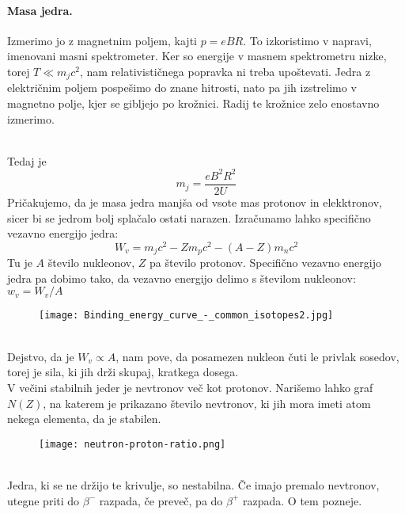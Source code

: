 \documentclass[a4paper]{article}
\begin{document}
\paragraph{Masa jedra.} Izmerimo jo z magnetnim poljem, kajti $p = eBR$. To izkoristimo v napravi, imenovani masni spektrometer.
Ker so energije v masnem spektrometru nizke, torej $T \ll m_jc^2$, nam relativističnega popravka ni treba upoštevati. Jedra z električnim poljem pospešimo do znane hitrosti,
nato pa jih izstrelimo v magnetno polje, kjer se gibljejo po krožnici. Radij te krožnice zelo enostavno izmerimo.
\begin{figure}
    \centering
\end{figure} \\
Tedaj je $$m_j = \frac{eB^2R^2}{2U}$$
Pričakujemo, da je masa jedra manjša od vsote mas protonov in elekktronov, sicer bi se jedrom bolj splačalo ostati narazen. Izračunamo lahko specifično vezavno energijo jedra:
$$W_v = m_jc^2 - Zm_pc^2 - (A-Z)m_nc^2$$
Tu je $A$ število nukleonov, $Z$ pa število protonov. Specifično vezavno energijo jedra pa dobimo tako, da vezavno energijo delimo s številom nukleonov: $w_v = W_v/A$
\begin{figure}[h!]
    \centering
    \texttt{[image: Binding\_energy\_curve\_-\_common\_isotopes2.jpg]}
\end{figure} \\
Dejstvo, da je $W_v \propto A$, nam pove, da posamezen nukleon čuti le privlak sosedov, torej je sila, ki jih drži skupaj, kratkega dosega. \\
V večini stabilnih jeder je nevtronov več kot protonov. Narišemo lahko graf $N(Z)$, na katerem je prikazano število nevtronov, ki jih mora imeti atom nekega elementa, da je stabilen. \\
\begin{figure}[h!]
    \centering
    \texttt{[image: neutron-proton-ratio.png]}
\end{figure} \\
Jedra, ki se ne držijo te krivulje, so nestabilna. Če imajo premalo nevtronov, utegne priti do $\beta^-$ razpada, če preveč, pa do $\beta^+$ razpada. O tem pozneje.
\end{document}
